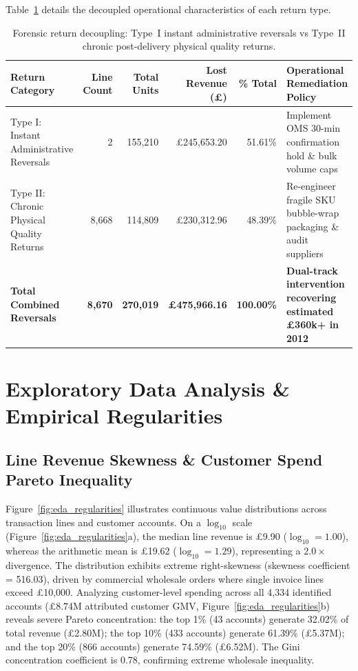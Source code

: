 \documentclass[sigconf,nonacm]{acmart}
\begin{document}
Table~\ref{tab:returns} details the decoupled operational characteristics of each return type.

\begin{table}[t]
\centering
\small
\caption{Forensic return decoupling: Type~I instant administrative reversals vs Type~II chronic post-delivery physical quality returns.}
\label{tab:returns}
\begin{tabular}{lrrrrl}
\toprule
\textbf{Return Category} & \textbf{Line Count} & \textbf{Total Units} & \textbf{Lost Revenue (£)} & \textbf{\% Total} & \textbf{Operational Remediation Policy} \\
\midrule
Type I: Instant Administrative Reversals & 2 & 155,210 & £245,653.20 & 51.61\% & Implement OMS 30-min confirmation hold \& bulk volume caps \\
Type II: Chronic Physical Quality Returns & 8,668 & 114,809 & £230,312.96 & 48.39\% & Re-engineer fragile SKU bubble-wrap packaging \& audit suppliers \\
\midrule
\textbf{Total Combined Reversals} & \textbf{8,670} & \textbf{270,019} & \textbf{£475,966.16} & \textbf{100.00\%} & \textbf{Dual-track intervention recovering estimated £360k+ in 2012} \\
\bottomrule
\end{tabular}
\end{table}

\section{Exploratory Data Analysis \& Empirical Regularities}

\subsection{Line Revenue Skewness \& Customer Spend Pareto Inequality}
Figure~\ref{fig:eda_regularities} illustrates continuous value distributions across transaction lines and customer accounts. On a $\log_{10}$ scale (Figure~\ref{fig:eda_regularities}a), the median line revenue is £9.90 ($\log_{10} = 1.00$), whereas the arithmetic mean is £19.62 ($\log_{10} = 1.29$), representing a $2.0\times$ divergence. The distribution exhibits extreme right-skewness (skewness coefficient = 516.03), driven by commercial wholesale orders where single invoice lines exceed £10,000. Analyzing customer-level spending across all 4,334 identified accounts (£8.74M attributed customer GMV, Figure~\ref{fig:eda_regularities}b) reveals severe Pareto concentration: the top 1\% (43 accounts) generate 32.02\% of total revenue (£2.80M); the top 10\% (433 accounts) generate 61.39\% (£5.37M); and the top 20\% (866 accounts) generate 74.59\% (£6.52M). The Gini concentration coefficient is 0.78, confirming extreme wholesale inequality.
\end{document}
